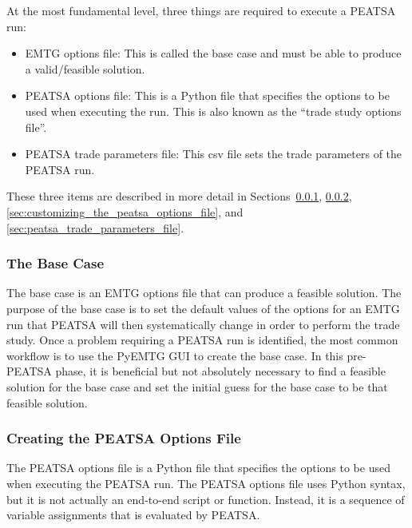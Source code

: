 
At the most fundamental level, three things are required to execute a \ac{PEATSA} run:

\begin{itemize}
	\item \ac{EMTG} options file: This is called the base case and must be able to produce a valid/feasible solution.
	\item \ac{PEATSA} options file: This is a Python file that specifies the options to be used when executing the run. This is also known as the ``trade study options file''.
	\item \ac{PEATSA} trade parameters file: This csv file sets the trade parameters of the \ac{PEATSA} run.
\end{itemize}

\noindent These three items are described in more detail in Sections~\ref{sec:peatsa_base_case}, \ref{sec:creating_the_peatsa_options_file}, \ref{sec:customizing_the_peatsa_options_file}, and \ref{sec:peatsa_trade_parameters_file}.

\subsubsection{The Base Case}
\label{sec:peatsa_base_case}

The base case is an \ac{EMTG} options file that can produce a feasible solution. The purpose of the base case is to set the default values of the options for an \ac{EMTG} run that \ac{PEATSA} will then systematically change in order to perform the trade study. Once a problem requiring a \ac{PEATSA} run is identified, the most common workflow is to use the PyEMTG \ac{GUI} to create the base case. In this pre-\ac{PEATSA} phase, it is beneficial but not absolutely necessary to find a feasible solution for the base case and set the initial guess for the base case to be that feasible solution.

\subsubsection{Creating the PEATSA Options File}
\label{sec:creating_the_peatsa_options_file}

The \ac{PEATSA} options file is a Python file that specifies the options to be used when executing the \ac{PEATSA} run. The \ac{PEATSA} options file uses Python syntax, but it is not actually an end-to-end script or function. Instead, it is a sequence of variable assignments that is evaluated by \ac{PEATSA}.

